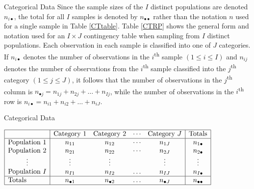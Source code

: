 \documentclass[
  ignorenonframetext,
]{beamer}
\begin{document}
\begin{frame}{Categorical Data}
\label{categorical-data-4}
Since the sample sizes of the \(I\) distinct populations are denoted
\(n_{i\bullet}\), the total for all \(I\) samples is denoted by
\(n_{\bullet\bullet}\) rather than the notation \(n\) used for a single
sample in Table \ref{CTtable}. Table \ref{CTRP} shows the general form
and notation used for an \(I \times J\) contingency table when sampling
from \(I\) distinct populations. Each observation in each sample is
classified into one of \(J\) categories. If \(n_{i\bullet}\) denotes the
number of observations in the \(i\)\textsuperscript{th} sample
\((1 \le i \le I)\) and \(n_{ij}\) denotes the number of observations
from the \(i\)\textsuperscript{th} sample classified into the
\(j\)\textsuperscript{th} category \((1 \le j \le J)\), it follows that
the number of observations in the \(j\)\textsuperscript{th} column is
\(n_{\bullet j}=n_{1j}+n_{2j}+\dots+n_{Ij}\), while the number of
observations in the \(i\)\textsuperscript{th} row is
\(n_{i\bullet}=n_{i1}+n_{i2}+\dots+n_{iJ}\).
\end{frame}

\begin{frame}{Categorical Data}
\label{categorical-data-5}
\begin{table}[!ht]\caption{General form and
notation used for an $I \times J$ contingency table when sampling from $I$
distinct populations\label{CTRP}}
\medskip
\setlength{\extrarowheight}{4pt}
\setlength{\arraycolsep}{2mm}
\centerline{
$
\begin{array}{|l|*{4}{c}|c|}
\hline
&\text{Category }1&\text{Category }2&\cdots&\text{Category }J&\text{Totals}\\ \hline
\text{Population }1&n_{11}&n_{12}&\cdots&n_{1J}&n_{1\bullet}\\
\text{Population } 2&n_{21}&n_{22}&\cdots&n_{2J}&n_{2\bullet}\\
\hfill\vdots\hfill&\vdots&\vdots&&\vdots&\vdots\\
\text{Population } I&n_{I1}&n_{I2}&\dotsc&n_{IJ}&n_{I\bullet}\\
\hline
\text{Totals}&n_{\bullet 1}&n_{\bullet 2}&\dotsc&n_{\bullet J}&n_{\bullet\bullet}\\
\hline
\end{array}
$}\setlength{\extrarowheight}{0pt}\setlength{\arraycolsep}{1.5pt}
\end{table}
\end{frame}
\end{document}
